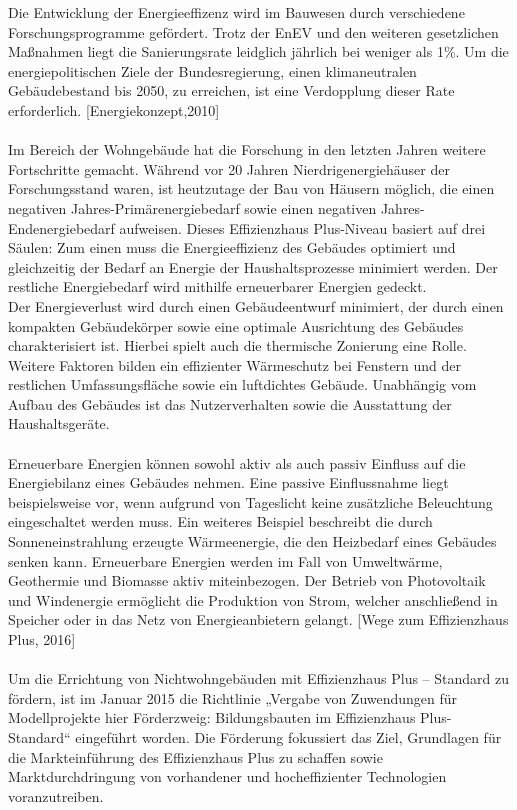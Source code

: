 Die Entwicklung der Energieeffizenz wird im Bauwesen durch verschiedene Forschungsprogramme gefördert. Trotz der EnEV und den weiteren gesetzlichen Maßnahmen liegt die Sanierungsrate leidglich jährlich bei weniger als 1\%. Um die energiepolitischen Ziele der Bundesregierung, einen klimaneutralen Gebäudebestand bis 2050, zu erreichen, ist eine Verdopplung dieser Rate erforderlich.  [Energiekonzept,2010] \\
\\
Im Bereich der Wohngebäude hat die Forschung in den letzten Jahren weitere Fortschritte gemacht. Während vor 20 Jahren Nierdrigenergiehäuser der Forschungsstand waren, ist heutzutage der Bau von Häusern möglich, die einen negativen Jahres-Primärenergiebedarf sowie einen negativen Jahres-Endenergiebedarf aufweisen. Dieses Effizienzhaus Plus-Niveau basiert auf drei Säulen: Zum einen muss die Energieeffizienz des Gebäudes optimiert und gleichzeitig der Bedarf an Energie der Haushaltsprozesse minimiert werden.  Der restliche Energiebedarf wird mithilfe erneuerbarer Energien gedeckt. \\
Der Energieverlust wird durch einen Gebäudeentwurf minimiert, der durch einen kompakten Gebäudekörper sowie eine optimale Ausrichtung des Gebäudes charakterisiert ist. Hierbei spielt auch die thermische Zonierung eine Rolle. Weitere Faktoren bilden ein effizienter Wärmeschutz bei Fenstern und der restlichen Umfassungsfläche sowie ein luftdichtes Gebäude. Unabhängig vom Aufbau des Gebäudes ist das Nutzerverhalten sowie die Ausstattung der Haushaltsgeräte. \\
\\
Erneuerbare Energien können sowohl aktiv als auch passiv Einfluss auf die Energiebilanz eines Gebäudes nehmen. Eine passive Einflussnahme liegt beispielsweise vor, wenn aufgrund von Tageslicht keine zusätzliche Beleuchtung eingeschaltet werden muss. Ein weiteres Beispiel beschreibt die durch Sonneneinstrahlung erzeugte Wärmeenergie, die den Heizbedarf eines Gebäudes senken kann. Erneuerbare Energien werden im Fall von Umweltwärme, Geothermie und Biomasse aktiv miteinbezogen. Der Betrieb von Photovoltaik und Windenergie ermöglicht die Produktion von Strom, welcher anschließend in Speicher oder in das Netz von Energieanbietern gelangt. [Wege zum Effizienzhaus Plus, 2016]\\
\\
Um die Errichtung von Nichtwohngebäuden mit Effizienzhaus Plus – Standard zu fördern, ist im Januar 2015 die Richtlinie „Vergabe von Zuwendungen für Modellprojekte hier Förderzweig: Bildungsbauten im Effizienzhaus Plus-Standard“ eingeführt worden. Die Förderung fokussiert das Ziel, Grundlagen für die Markteinführung des Effizienzhaus Plus zu schaffen sowie Marktdurchdringung von vorhandener und hocheffizienter Technologien voranzutreiben. \\
